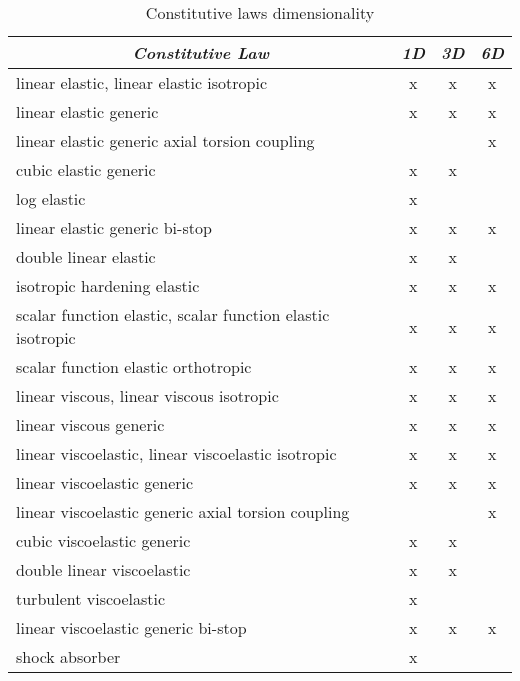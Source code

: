 \begin{table}[h]
    \newlength{\constlawwidth}
    \setlength{\constlawwidth}{70mm}
    \centering
    \caption{Constitutive laws dimensionality}\label{tab:CONST-LAW-DIM}
    \begin{tabular}{l|c|c|c} 
        \hline
        \multicolumn{1}{c}{\textbf{\emph{Constitutive Law}}} &
	\multicolumn{1}{c}{\textbf{\emph{1D}}} &
	\multicolumn{1}{c}{\textbf{\emph{3D}}} &
	\multicolumn{1}{c}{\textbf{\emph{6D}}} \\ 
	\hline
	linear elastic, linear elastic isotropic			& x & x & x \\
	linear elastic generic						& x & x & x \\
	linear elastic generic axial torsion coupling			&   &   & x \\
	cubic elastic generic						& x & x &   \\
	log elastic							& x &   &   \\
	linear elastic generic bi-stop					& x & x & x \\
	double linear elastic						& x & x &   \\
	isotropic hardening elastic					& x & x & x \\
	scalar function elastic, scalar function elastic isotropic	& x & x & x \\
	scalar function elastic orthotropic				& x & x & x \\
	linear viscous, linear viscous isotropic			& x & x & x \\
	linear viscous generic						& x & x & x \\
	linear viscoelastic, linear viscoelastic isotropic		& x & x & x \\
	linear viscoelastic generic					& x & x & x \\
	linear viscoelastic generic axial torsion coupling		&   &   & x \\
	cubic viscoelastic generic					& x & x &   \\
	double linear viscoelastic					& x & x &   \\
	turbulent viscoelastic						& x &   &   \\
	linear viscoelastic generic bi-stop				& x & x & x \\
	shock absorber							& x &   &   \\
	\hline
    \end{tabular}
\end{table}

